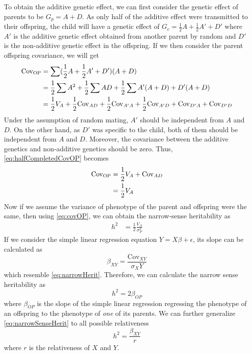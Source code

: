 \documentclass{book}
\begin{document}
	To obtain the additive genetic effect, we can first consider the genetic effect of parents to be $G_p=A+D$. 
	As only half of the additive effect were transmitted to their offspring, the child will have a genetic effect of $G_c=\frac{1}{2}A+\frac{1}{2}A'+D'$ where $A'$ is the additive genetic effect obtained from another parent by random and $D'$ is the non-additive genetic effect in the offspring.
	If we then consider the parent offspring covariance, we will get
	\begin{align}
	\mathrm{Cov_{OP}}&= \sum(\frac{1}{2}A+\frac{1}{2}A'+D')(A+D)\notag\\
	&=\frac{1}{2}\sum A^2+\frac{1}{2}\sum AD + \frac{1}{2}\sum A'(A+D) +D'(A+D) \notag\\ 
	&=\frac{1}{2}V_A+ \frac{1}{2}\mathrm{Cov}_{AD} + \frac{1}{2}\mathrm{Cov}_{A'A} + \frac{1}{2}\mathrm{Cov}_{A'D} +\mathrm{Cov}_{D'A} +\mathrm{Cov}_{D'D}  
	\label{eq:halfCompletedCovOP}
	\end{align} 
	Under the assumption of random mating,  $A'$ should be independent from $A$ and $D$. 
	On the other hand, as $D'$ was specific to the child, both of them should be independent from $A$ and $D$.
	Moreover, the covariance between the additive genetics and non-additive genetics should be zero\citep{Falconer1996}.
	Thus, \cref{eq:halfCompletedCovOP} becomes
	\begin{align}
	\mathrm{Cov_{OP}} &= \frac{1}{2}V_A+\mathrm{Cov}_{AD} \notag\\
	&= \frac{1}{2}V_A
	\label{eq:covOP}
	\end{align}
	Now if we assume the variance of phenotype of the parent and offspring were the same, then using \cref{eq:covOP}, we can obtain the narrow-sense heritability as
	\begin{align}
	h^2 &= \frac{1}{2}\frac{V_A}{\sigma_P^2}
	\label{eq:narrowHerit}
	\end{align}
	If we consider the simple linear regression equation $Y=X\beta+\epsilon$, its slope can be calculated as 
	$$
	\beta_{XY} = \frac{\mathrm{Cov}_{XY}}{\sigma_{X}{Y}}
	$$
	which resemble \cref{eq:narrowHerit}. 
	Therefore,  we can calculate the narrow sense heritability as
	$$
	h^2 = 2\beta_{OP}
	\label{eq:narrowSenseHerit}
	$$
	where $\beta_{OP}$ is the slope of the simple linear regression regressing the phenotype of an offspring to the phenotype of \emph{one} of its parents.
	We can further generalize \cref{eq:narrowSenseHerit} to all possible relativeness 
	$$
	h^2=\frac{\beta_{XY}}{r}
	\label{eq:finalNarrow}
	$$
	where $r$ is the relativeness of $X$ and $Y$.
	
\end{document}
